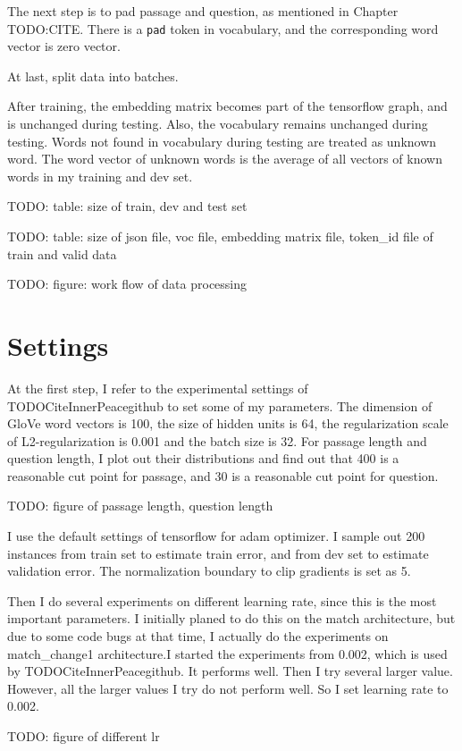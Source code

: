 \documentclass[modernstyle,12pt]{sjsuthesis}
\theoremstyle{definition}
\begin{document}
The next step is to pad passage and question, as mentioned in Chapter TODO:CITE. There is a {\tt pad} token in vocabulary, and the corresponding word vector is zero vector.

At last, split data into batches.

After training, the embedding matrix becomes part of the tensorflow graph, and is unchanged during testing. Also, the vocabulary remains unchanged during testing. Words not found in vocabulary during testing are treated as unknown word. The word vector of unknown words is the average of all vectors of known words in my training and dev set.

TODO: table: size of train, dev and test set

TODO: table: size of json file, voc file, embedding matrix file, token\_id file of train and valid data

TODO: figure: work flow of data processing

\section{Settings}
At the first step, I refer to the experimental settings of TODOCiteInnerPeacegithub to set some of my parameters. The dimension of GloVe word vectors is 100, the size of hidden units is 64, the regularization scale of L2-regularization is 0.001 and the batch size is 32. For passage length and question length, I plot out their distributions and find out that 400 is a reasonable cut point for passage, and 30 is a reasonable cut point for question.

TODO: figure of passage length, question length

I use the default settings of tensorflow for adam optimizer. I sample out 200 instances from train set to estimate train error, and from dev set to estimate validation error. The normalization boundary to clip gradients is set as 5.

Then I do several experiments on different learning rate, since this is the most important parameters. I initially planed to do this on the match architecture, but due to some code bugs at that time, I actually do the experiments on match\_change1 architecture.I started the experiments from 0.002, which is used by TODOCiteInnerPeacegithub. It performs well. Then I try several larger value. However, all the larger values I try do not perform well. So I set learning rate to 0.002.

TODO: figure of different lr
\end{document}

